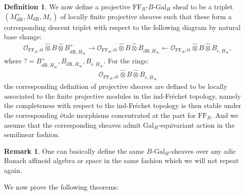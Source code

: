 \documentclass[12pt]{amsart}
\theoremstyle{definition}
\newtheorem{definition}[theorem]{Definition}
\newtheorem{remark}[theorem]{Remark}
\numberwithin{equation}{section}
\begin{document}
\begin{definition}
We now define a projective $\mathrm{FF}_R$-$B$-$\mathrm{Gal}_H$ sheaf to be a triplet $(M^+_\mathrm{dR},M_\mathrm{dR},M_e)$ of locally finite projective sheaves such that these form a corresponding descent triplet with respect to the following diagram by natural base change:
\begin{align}
\mathcal{O}_{\mathrm{FF}_R,\text{\'et}}\widehat{\otimes}B\widehat{\otimes}B_{\mathrm{dR},\overline{H}_\infty}^+ \longrightarrow \mathcal{O}_{\mathrm{FF}_R,\text{\'et}}\widehat{\otimes}B\widehat{\otimes}B_{\mathrm{dR},\overline{H}_\infty}\longleftarrow \mathcal{O}_{\mathrm{FF}_R,\text{\'et}}\widehat{\otimes}B\widehat{\otimes}B_{e,\overline{H}_\infty},	
\end{align}
where $?=B_{\mathrm{dR},\overline{H}_\infty}^+,B_{\mathrm{dR},\overline{H}_\infty},B_{e,\overline{H}_\infty}$. For the rings:
\begin{align}
\mathcal{O}_{\mathrm{FF}_R,\text{\'et}}\widehat{\otimes}B\widehat{\otimes}B_{e,\overline{H}_\infty}	
\end{align}
the corresponding definition of projective sheaves are defined to be locally associated to the finite projective modules in the ind-Fr\'echet topology, namely the completeness with respect to the ind-Fr\'echet topology is then stable under the corresponding \'etale morphisms concentrated at the part for $\mathrm{FF}_R$. And we assume that the corresponding sheaves admit $\mathrm{Gal}_H$-equivariant action in the semilinear fashion.	
\end{definition}






\begin{remark}
One can basically define the same $B$-$\mathrm{Gal}_H$-sheaves over any adic Banach affinoid algebra or space in the same fashion which we will not repeat again.
\end{remark}



\indent We now prove the following theorems:
\end{document}
